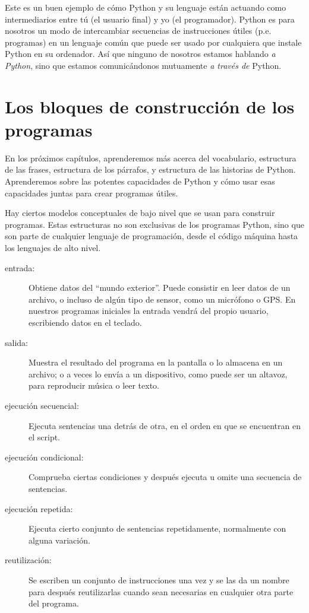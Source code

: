 Este es un buen ejemplo de cómo Python y su lenguaje están actuando como
intermediarios entre tú (el usuario final) y yo (el programador). Python es para nosotros
un modo de intercambiar secuencias de instrucciones útiles (p.e. programas) en un
lenguaje común que puede ser usado por cualquiera que instale
Python en su ordenador. Así que ninguno de nosotros estamos hablando {\em a Python},
sino que estamos comunicándonos mutuamente {\em a través de} Python.

\section{Los bloques de construcción de los programas}

En los próximos capítulos, aprenderemos más acerca del vocabulario, estructura de las
frases, estructura de los párrafos, y estructura de las historias de Python. Aprenderemos
sobre las potentes capacidades de Python y cómo usar esas capacidades juntas para crear
programas útiles.

Hay ciertos modelos conceptuales de bajo nivel que se usan para construir programas.
Estas estructuras no son exclusivas de los programas Python, sino que son parte de
cualquier lenguaje de programación, desde el código máquina hasta los lenguajes de alto
nivel.

\begin{description}

\item[entrada:] Obtiene datos del ``mundo exterior''. Puede consistir en
leer datos de un archivo, o incluso de algún tipo de sensor, como un micrófono
o GPS. En nuestros programas iniciales la entrada vendrá del propio usuario,
escribiendo datos en el teclado.

\item[salida:] Muestra el resultado del programa en la pantalla
o lo almacena en un archivo; o a veces lo envía a un dispositivo, como puede ser
un altavoz, para reproducir música o leer texto.

\item[ejecución secuencial:] Ejecuta sentencias una detrás de otra,
en el orden en que se encuentran en el script.

\item[ejecución condicional:] Comprueba ciertas condiciones y
después ejecuta u omite una secuencia de sentencias.

\item[ejecución repetida:] Ejecuta cierto conjunto de sentencias
repetidamente, normalmente con alguna variación.

\item[reutilización:] Se escriben un conjunto de instrucciones una vez y se las da un nombre
para después reutilizarlas cuando sean necesarias en cualquier otra parte
del programa.

\end{description}


